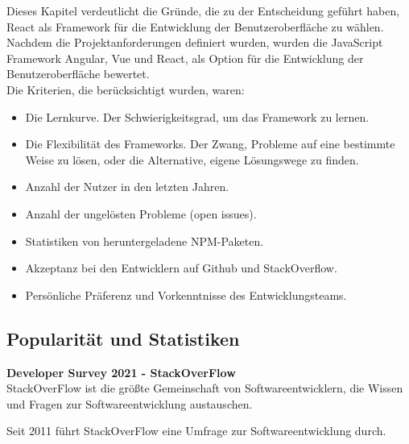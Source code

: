 \begin{flushleft}
  Dieses Kapitel verdeutlicht die Gründe, die zu der Entscheidung geführt haben, React als Framework für die Entwicklung der Benutzeroberfläche zu wählen.
  \\
  Nachdem die Projektanforderungen definiert wurden, wurden die JavaScript Framework Angular, Vue und React, als Option für die Entwicklung der Benutzeroberfläche bewertet.
  \\
  Die Kriterien, die berücksichtigt wurden, waren:

  \begin{itemize}
    \item
          Die Lernkurve. Der Schwierigkeitsgrad, um das Framework zu lernen.

    \item
          Die Flexibilität des Frameworks.
          Der Zwang, Probleme auf eine bestimmte Weise zu lösen, oder die Alternative, eigene Lösungswege zu finden.

    \item
          Anzahl der Nutzer in den letzten Jahren.

    \item
          Anzahl der ungelösten Probleme (open issues).

    \item
          Statistiken von heruntergeladene NPM-Paketen.

    \item
          Akzeptanz bei den Entwicklern auf Github und StackOverflow.

    \item
          Persönliche Präferenz und Vorkenntnisse des Entwicklungsteams.
  \end{itemize}

\end{flushleft}

\subsection{Popularität und Statistiken}
\begin{flushleft}
  \textbf{Developer Survey 2021 - StackOverFlow}\\
  StackOverFlow ist die größte Gemeinschaft von Softwareentwicklern, die Wissen und Fragen zur Softwareentwicklung austauschen.

  Seit 2011 führt StackOverFlow eine Umfrage zur Softwareentwicklung durch.
\end{flushleft}

